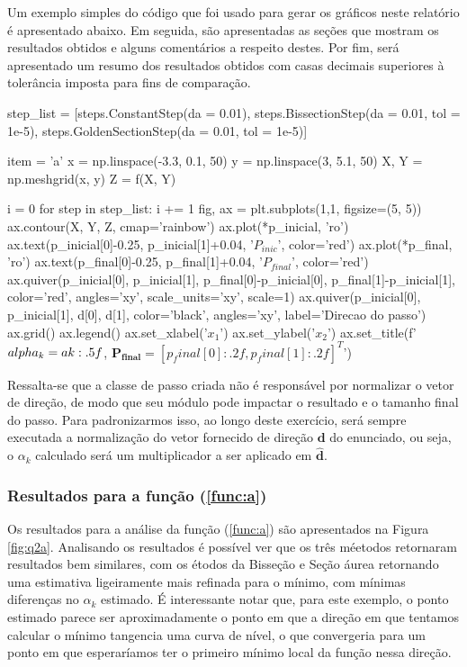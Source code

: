\documentclass[10pt, a4paper]{article}
\begin{document}
Um exemplo simples do código que foi usado para gerar os gráficos neste relatório é apresentado abaixo. 
Em seguida, são apresentadas as seções que mostram os resultados obtidos e alguns comentários a respeito destes. Por fim, será apresentado um resumo dos 
resultados obtidos com casas decimais superiores à tolerância imposta para fins de comparação.

\begin{python}
step_list   = [steps.ConstantStep(da = 0.01), steps.BissectionStep(da = 0.01, tol = 1e-5), steps.GoldenSectionStep(da = 0.01, tol = 1e-5)]

item = 'a'
x = np.linspace(-3.3, 0.1, 50)
y = np.linspace(3, 5.1, 50)
X, Y = np.meshgrid(x, y)
Z = f(X, Y)

i = 0
for step in step_list:
    i += 1
    fig, ax = plt.subplots(1,1, figsize=(5, 5))
    ax.contour(X, Y, Z, cmap='rainbow')
    ax.plot(*p_inicial, 'ro')
    ax.text(p_inicial[0]-0.25, p_inicial[1]+0.04, '$P_{inic}$', color='red')
    ax.plot(*p_final, 'ro')
    ax.text(p_final[0]-0.25, p_final[1]+0.04, '$P_{final}$', color='red')
    ax.quiver(p_inicial[0], p_inicial[1], p_final[0]-p_inicial[0], p_final[1]-p_inicial[1], color='red', angles='xy', scale_units='xy', scale=1)
    ax.quiver(p_inicial[0], p_inicial[1], d[0], d[1], color='black', angles='xy', label='Direcao do passo')
    ax.grid()
    ax.legend()
    ax.set_xlabel('$x_1$')
    ax.set_ylabel('$x_2$')
    ax.set_title(f'$\\alpha_k = {ak:.5f}$, $\mathbf{{P_{{final}}}} = [{p_final[0]:.2f}, {p_final[1]:.2f}]^T$')
\end{python}

Ressalta-se que a classe de passo criada não é responsável por normalizar o vetor de direção, de modo que seu módulo pode impactar o resultado e o tamanho 
final do passo. Para padronizarmos isso, ao longo deste exercício, será sempre executada a normalização do vetor fornecido de direção $\mathbf{d}$ do enunciado, 
ou seja, o $\alpha_k$ calculado será um multiplicador a ser aplicado em $\mathbf{\hat{d}}$.
\subsubsection{Resultados para a função (\ref{func:a})}

Os resultados para a análise da função (\ref{func:a}) são apresentados na Figura \ref{fig:q2a}. Analisando os resultados
é possível ver que os três méetodos retornaram resultados bem similares, com os étodos da Bisseção e Seção áurea retornando
uma estimativa ligeiramente mais refinada para o mínimo, com mínimas diferenças no $\alpha_k$ estimado. É interessante notar que,
para este exemplo, o ponto estimado parece ser aproximadamente o ponto em que a direção em que tentamos calcular o mínimo
tangencia uma curva de nível, o que convergeria para um ponto em que esperaríamos ter o primeiro mínimo local da função nessa direção.
\end{document}
